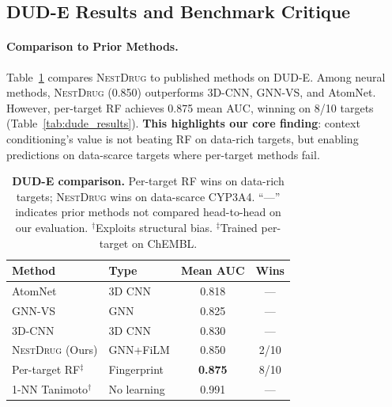 \documentclass{article}
\newcommand{\methodname}{\textsc{NestDrug}}
\begin{document}
\subsection{DUD-E Results and Benchmark Critique}

\paragraph{Comparison to Prior Methods.} Table~\ref{tab:sota} compares \methodname{} to published methods on DUD-E. Among neural methods, \methodname{} (0.850) outperforms 3D-CNN, GNN-VS, and AtomNet. However, per-target RF achieves 0.875 mean AUC, winning on 8/10 targets (Table~\ref{tab:dude_results}). \textbf{This highlights our core finding}: context conditioning's value is not beating RF on data-rich targets, but enabling predictions on data-scarce targets where per-target methods fail.

\begin{table}[t]
\vspace{-2mm}
\caption{\textbf{DUD-E comparison.} Per-target RF wins on data-rich targets; \methodname{} wins on data-scarce CYP3A4. ``---'' indicates prior methods not compared head-to-head on our evaluation. $^\dagger$Exploits structural bias. $^\ddagger$Trained per-target on ChEMBL.}
\label{tab:sota}
\centering
\small
\begin{tabular}{@{}llcc@{}}
\toprule
\textbf{Method} & \textbf{Type} & \textbf{Mean AUC} & \textbf{Wins} \\
\midrule
AtomNet \citep{wallach_2015_atomnet} & 3D CNN & 0.818 & --- \\
GNN-VS \citep{lim_2019_gnn_vs} & GNN & 0.825 & --- \\
3D-CNN \citep{ragoza_2017_3dcnn} & 3D CNN & 0.830 & --- \\
\methodname{} (Ours) & GNN+FiLM & 0.850 & 2/10 \\
Per-target RF$^\ddagger$ & Fingerprint & \textbf{0.875} & 8/10 \\
\midrule
1-NN Tanimoto$^\dagger$ & No learning & 0.991 & --- \\
\bottomrule
\end{tabular}
\vspace{-2mm}
\end{table}
\end{document}
